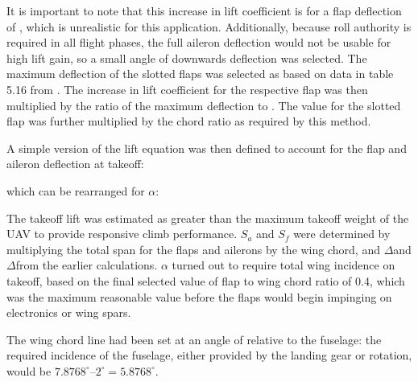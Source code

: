 \documentclass[../../main.tex]{subfiles}
\begin{document}
It is important to note that this increase in lift coefficient is for a flap deflection of , which is unrealistic for this application.
Additionally, because roll authority is required in all flight phases, the full aileron deflection would not be usable for high lift gain, so a small angle of  downwards deflection was selected.
The maximum deflection of the slotted flaps was selected as  based on data in table 5.16 from \cite{sadraey-13}.
The increase in lift coefficient for the respective flap was then multiplied by the ratio of the maximum deflection to .
The value for the slotted flap was further multiplied by the chord ratio as required by this method. 

A simple version of the lift equation was then defined to account for the flap and aileron deflection at takeoff: 


which can be rearranged for $\alpha$:


The takeoff lift was estimated as  greater than the maximum takeoff weight of the UAV to provide responsive climb performance.
$S_a$ and $S_f$ were determined by multiplying the total span for the flaps and ailerons by the wing chord, and $\Delta$\cla and $\Delta$\clf from the earlier calculations.
$\alpha$ turned out to require  total wing incidence on takeoff, based on the final selected value of flap to wing chord ratio of 0.4, which was the maximum reasonable value before the flaps would begin impinging on electronics or wing spars.

The wing chord line had been set at an angle of  relative to the fuselage: the required incidence of the fuselage, either provided by the landing gear or rotation, would be $7.8768^\circ – 2^\circ = 5.8768^\circ$. 
\end{document}

